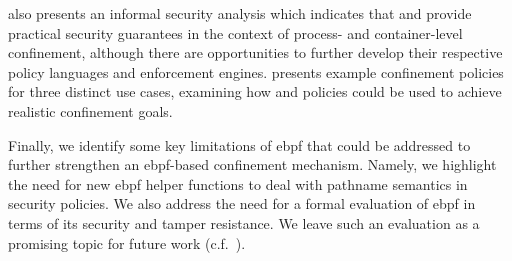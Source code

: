  also presents an informal security analysis which indicates that
\bpfbox{} and \bpfcontain{} provide practical security guarantees in the context of
process- and container-level confinement, although there are opportunities to further
develop their respective policy languages and enforcement engines. 
presents example confinement policies for three distinct use cases, examining how
\bpfbox{} and \bpfcontain{} policies could be used to achieve realistic confinement goals.

Finally, we identify some key limitations of \gls{ebpf} that could be addressed to further
strengthen an \gls{ebpf}-based confinement mechanism. Namely, we highlight the need for
new \gls{ebpf} helper functions to deal with pathname semantics in security policies.  We
also address the need for a formal evaluation of \gls{ebpf} in terms of its security and
tamper resistance. We leave such an evaluation as a promising topic for future work
(c.f.~).




